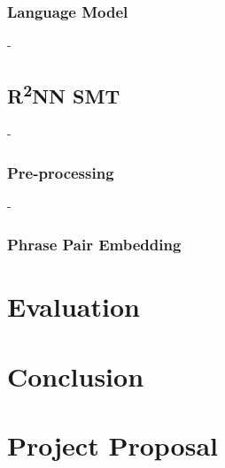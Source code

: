 \documentclass[12pt,a4paper,twoside,openright]{report}
\begin{document}
\subsection{Language Model}
-

\section{\texorpdfstring{R\textsuperscript{2}NN}{R2NN} SMT}
-

\subsection{Pre-processing}
-

\subsection{Phrase Pair Embedding}

\chapter{Evaluation}

\chapter{Conclusion}




\appendix

\chapter{Project Proposal}








% 
\end{document}
